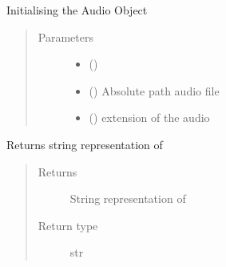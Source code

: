 \documentclass[letterpaper,10pt,english,openany,oneside]{sphinxmanual}
\begin{document}
\begin{fulllineitems}
\begin{quote}
\begin{description}
\end{description}\end{quote}

\begin{fulllineitems}
\label{\detokenize{docs/source/preprocess:preprocess.track_classes.Audio.__init__}}
Initialising the Audio Object
\begin{quote}\begin{description}
\item[{Parameters}] \leavevmode\begin{itemize}
\item {} 
 () \textendash{} 

\item {} 
 () \textendash{} Absolute path audio file

\item {} 
 () \textendash{} extension of the audio

\end{itemize}

\end{description}\end{quote}

\end{fulllineitems}


\begin{fulllineitems}
\label{\detokenize{docs/source/preprocess:preprocess.track_classes.Audio.__repr__}}
Returns string representation of 
\begin{quote}\begin{description}
\item[{Returns}] \leavevmode
String representation of 

\item[{Return type}] \leavevmode
str


\end{description}
\end{quote}
\end{fulllineitems}
\end{fulllineitems}
\end{document}
